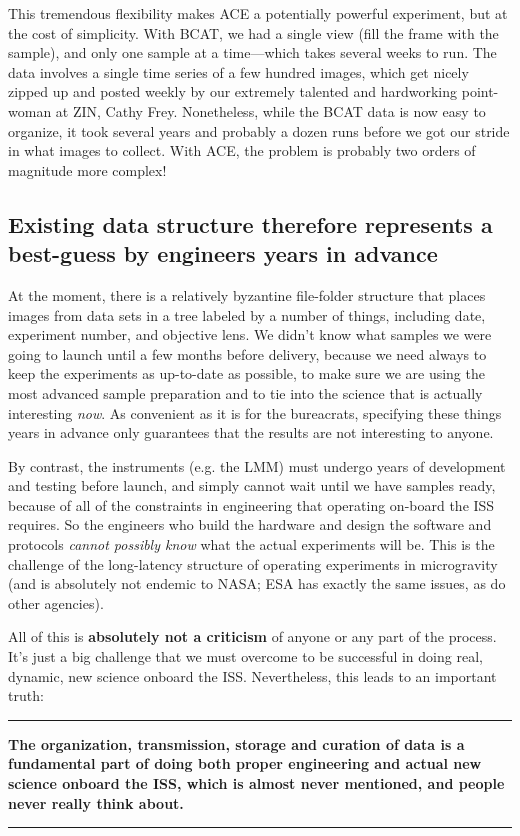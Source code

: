 This tremendous flexibility makes ACE a potentially powerful experiment, but at
the cost of simplicity. With BCAT, we had a single view (fill the frame with the
sample), and only one sample at a time---which takes several weeks to run. The
data involves a single time series of a few hundred images, which get nicely
zipped up and posted weekly by our extremely talented and hardworking
point-woman at ZIN, Cathy Frey. Nonetheless, while the BCAT data is now easy to
organize, it took several years and probably a dozen runs before we got our
stride in what images to collect. With ACE, the problem is probably two orders
of magnitude more complex!

\subsection{Existing data structure therefore represents a best-guess by engineers years in advance}\hypertarget{existing-data-structure-therefore-represents-a-best-guess-by-engineers-years-in-advance}{}\label{existing-data-structure-therefore-represents-a-best-guess-by-engineers-years-in-advance}
At the moment, there is a relatively byzantine file-folder structure that places
images from data sets in a tree labeled by a number of things, including date,
experiment number, and objective lens. We didn't know what samples we were going
to launch until a few months before delivery, because we need always to keep the
experiments as up-to-date as possible, to make sure we are using the most
advanced sample preparation and to tie into the science that is actually
interesting \emph{now}. As convenient as it is for the bureacrats, specifying
these things years in advance only guarantees that the results are not
interesting to anyone.

By contrast, the instruments (e.g. the LMM) must undergo years of development
and testing before launch, and simply cannot wait until we have samples ready,
because of all of the constraints in engineering that operating on-board the ISS
requires. So the engineers who build the hardware and design the software and
protocols \emph{cannot possibly know} what the actual experiments will be. This
is the challenge of the long-latency structure of operating experiments in
microgravity (and is absolutely not endemic to NASA; ESA has exactly the same
issues, as do other agencies).

All of this is \textbf{absolutely not a criticism} of anyone or any part of the
process. It's just a big challenge that we must overcome to be successful in
doing real, dynamic, new science onboard the ISS. Nevertheless, this leads to an
important truth:
\begin{center}
\rule{\columnwidth}{0.5pt}

\textbf{The organization, transmission, storage and curation of data is
a fundamental part of doing both proper engineering and actual new science onboard
the ISS, which is almost never mentioned, and people never really think about.}
\rule{\columnwidth}{0.5pt}
\end{center}

